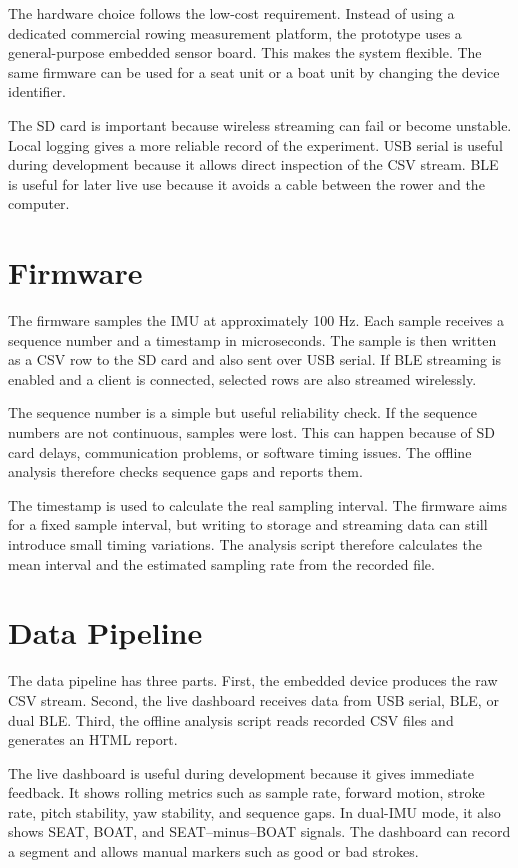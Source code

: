 The hardware choice follows the low-cost requirement. Instead of using a dedicated commercial rowing measurement platform, the prototype uses a general-purpose embedded sensor board. This makes the system flexible. The same firmware can be used for a seat unit or a boat unit by changing the device identifier.

The SD card is important because wireless streaming can fail or become unstable. Local logging gives a more reliable record of the experiment. USB serial is useful during development because it allows direct inspection of the CSV stream. BLE is useful for later live use because it avoids a cable between the rower and the computer.

\section{Firmware}

The firmware samples the IMU at approximately 100 Hz. Each sample receives a sequence number and a timestamp in microseconds. The sample is then written as a CSV row to the SD card and also sent over USB serial. If BLE streaming is enabled and a client is connected, selected rows are also streamed wirelessly.

The sequence number is a simple but useful reliability check. If the sequence numbers are not continuous, samples were lost. This can happen because of SD card delays, communication problems, or software timing issues. The offline analysis therefore checks sequence gaps and reports them.

The timestamp is used to calculate the real sampling interval. The firmware aims for a fixed sample interval, but writing to storage and streaming data can still introduce small timing variations. The analysis script therefore calculates the mean interval and the estimated sampling rate from the recorded file.

\section{Data Pipeline}

The data pipeline has three parts. First, the embedded device produces the raw CSV stream. Second, the live dashboard receives data from USB serial, BLE, or dual BLE. Third, the offline analysis script reads recorded CSV files and generates an HTML report.

The live dashboard is useful during development because it gives immediate feedback. It shows rolling metrics such as sample rate, forward motion, stroke rate, pitch stability, yaw stability, and sequence gaps. In dual-IMU mode, it also shows SEAT, BOAT, and SEAT--minus--BOAT signals. The dashboard can record a segment and allows manual markers such as good or bad strokes.

